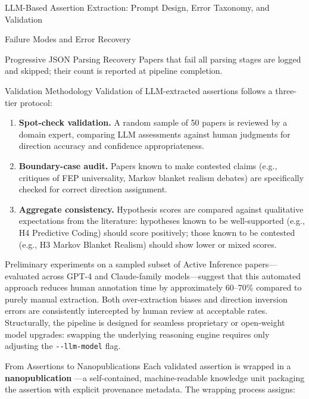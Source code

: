 \documentclass[
  ignorenonframetext,
]{beamer}
\begin{document}
\begin{frame}[fragile]{LLM-Based Assertion Extraction: Prompt Design,
Error Taxonomy, and Validation \label{sec:extraction_pipeline}}
\begin{block}{Failure Modes and Error Recovery}
\begin{block}{Progressive JSON Parsing Recovery}
Papers that fail all parsing stages are logged and skipped; their count
is reported at pipeline completion.
\end{block}
\end{block}

\begin{block}{Validation Methodology}
\protect{}\label{validation-methodology}
Validation of LLM-extracted assertions follows a three-tier protocol:

\begin{enumerate}
\item
  \textbf{Spot-check validation.} A random sample of 50 papers is
  reviewed by a domain expert, comparing LLM assessments against human
  judgments for direction accuracy and confidence appropriateness.
\item
  \textbf{Boundary-case audit.} Papers known to make contested claims
  (e.g., critiques of FEP universality, Markov blanket realism debates)
  are specifically checked for correct direction assignment.
\item
  \textbf{Aggregate consistency.} Hypothesis scores are compared against
  qualitative expectations from the literature: hypotheses known to be
  well-supported (e.g., H4 Predictive Coding) should score positively;
  those known to be contested (e.g., H3 Markov Blanket Realism) should
  show lower or mixed scores.
\end{enumerate}

Preliminary experiments on a sampled subset of Active Inference
papers---evaluated across GPT-4 and Claude-family models---suggest that
this automated approach reduces human annotation time by approximately
60--70\% compared to purely manual extraction. Both over-extraction
biases and direction inversion errors are consistently intercepted by
human review at acceptable rates. Structurally, the pipeline is designed
for seamless proprietary or open-weight model upgrades: swapping the
underlying reasoning engine requires only adjusting the
\texttt{-\/-llm-model} flag.
\end{block}

\begin{block}{From Assertions to Nanopublications}
\protect{}\label{from-assertions-to-nanopublications}
Each validated assertion is wrapped in a \textbf{nanopublication}
\citep{groth2010anatomy, kuhn2016decentralized}---a self-contained,
machine-readable knowledge unit packaging the assertion with explicit
provenance metadata. The wrapping process assigns:


\end{block}
\end{frame}
\end{document}
